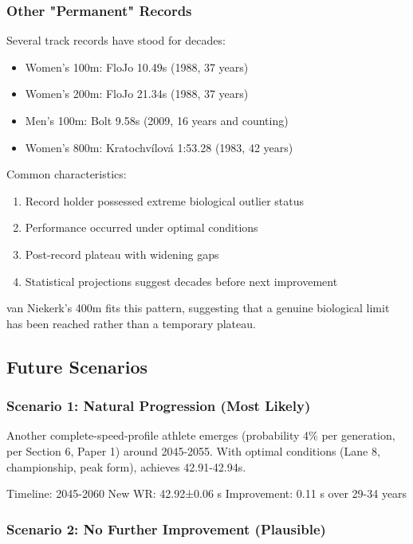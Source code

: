 \subsubsection{Other "Permanent" Records}

Several track records have stood for decades:
\begin{itemize}
    \item Women's 100m: FloJo 10.49s (1988, 37 years)
    \item Women's 200m: FloJo 21.34s (1988, 37 years)
    \item Men's 100m: Bolt 9.58s (2009, 16 years and counting)
    \item Women's 800m: Kratochvílová 1:53.28 (1983, 42 years)
\end{itemize}

Common characteristics:
\begin{enumerate}
    \item Record holder possessed extreme biological outlier status
    \item Performance occurred under optimal conditions
    \item Post-record plateau with widening gaps
    \item Statistical projections suggest decades before next improvement
\end{enumerate}

van Niekerk's 400m fits this pattern, suggesting that a genuine biological limit has been reached rather than a temporary plateau.

\subsection{Future Scenarios}

\subsubsection{Scenario 1: Natural Progression (Most Likely)}

Another complete-speed-profile athlete emerges (probability 4\% per generation, per Section 6, Paper 1) around 2045-2055. With optimal conditions (Lane 8, championship, peak form), achieves 42.91-42.94s.

Timeline: 2045-2060
New WR: 42.92±0.06
s Improvement: 0.11 s over 29-34 years

\subsubsection{Scenario 2: No Further Improvement (Plausible)}


